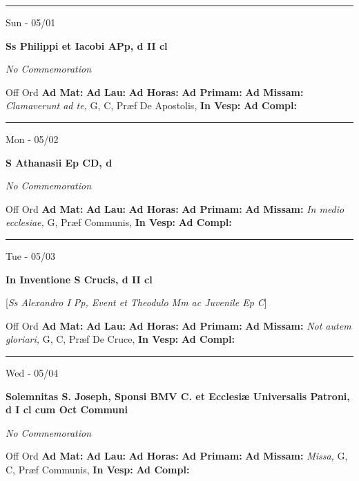 \documentclass[letterpaper, 10pt]{article}
\begin{document}
\hrule
\begin{center}
Sun - 05/01
\end{center}\textbf{ \large Ss Philippi et Iacobi APp, \textnormal{\normalsize d II cl}}

\textit{No Commemoration}\begin{justify}
Off Ord
\textbf{Ad Mat: }
\textbf{Ad Lau: }
\textbf{Ad Horas: }
\textbf{Ad Primam: }
\textbf{Ad Missam:} \textit{Clamaverunt ad te, } G, C, Præf De Apostolis, 
\textbf{In Vesp: }
\textbf{Ad Compl: }\end{justify}



\hrule
\begin{center}
Mon - 05/02
\end{center}\textbf{ \large S Athanasii Ep CD, \textnormal{\normalsize d}}

\textit{No Commemoration}\begin{justify}
Off Ord
\textbf{Ad Mat: }
\textbf{Ad Lau: }
\textbf{Ad Horas: }
\textbf{Ad Primam: }
\textbf{Ad Missam:} \textit{In medio ecclesiae, } G, Præf Communis, 
\textbf{In Vesp: }
\textbf{Ad Compl: }\end{justify}



\hrule
\begin{center}
Tue - 05/03
\end{center}\textbf{ \large In Inventione S Crucis, \textnormal{\normalsize d II cl}}

[\textit{Ss Alexandro I Pp, Event et Theodulo Mm ac Juvenile Ep C}]
\begin{justify}
Off Ord
\textbf{Ad Mat: }
\textbf{Ad Lau: }
\textbf{Ad Horas: }
\textbf{Ad Primam: }
\textbf{Ad Missam:} \textit{Not autem gloriari, } G, C, Præf De Cruce, 
\textbf{In Vesp: }
\textbf{Ad Compl: }\end{justify}



\hrule
\begin{center}
Wed - 05/04
\end{center}\textbf{ \large Solemnitas S. Joseph, Sponsi BMV C. et Ecclesiæ Universalis Patroni, \textnormal{\normalsize d I cl cum Oct Communi}}

\textit{No Commemoration}\begin{justify}
Off Ord
\textbf{Ad Mat: }
\textbf{Ad Lau: }
\textbf{Ad Horas: }
\textbf{Ad Primam: }
\textbf{Ad Missam:} \textit{Missa, } G, C, Præf Communis, 
\textbf{In Vesp: }
\textbf{Ad Compl: }\end{justify}
\end{document}
